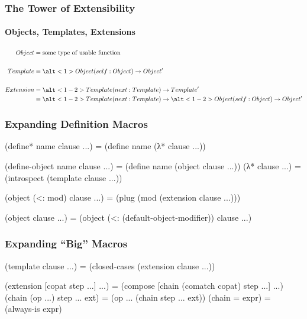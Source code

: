 \documentclass{beamer}
\begin{document}
\begin{frame}
\frametitle{The Tower of Extensibility}
\framesubtitle{Objects, Templates, Extensions}

\begin{align*}
  Object
  &=
  \text{some type of usable function}
  \\\\
  Template
  &=
  \alt<1>{Object}{(self : Object)} \to Object'
  \\\\
  Extension
  &=
  \alt<1-2>{Template}{(next : Template)} \to Template'
  \\
  &=
  \alt<1-2>{Template}{(next : Template)}
  \to \alt<1-2>{Object}{(self : Object)}
  \to Object'
\end{align*}

\pause\pause
\end{frame}

\let\mintscheme\scheme
\let\mintendscheme\endscheme
\let\scheme\relax
\let\endscheme\relax
{}

\begin{frame}[fragile]
\frametitle{Expanding Definition Macros}

\begin{scheme}
(define* name clause ...)
= (define name (λ* clause ...))

(define-object name clause ...)
= (define name (object clause ...))
\end{scheme}
\pause
\begin{scheme}
(λ* clause ...) = (introspect (template clause ...))

(object (<: mod) clause ...)
= (plug (mod (extension clause ...)))

(object clause ...)
= (object (<: (default-object-modifier)) clause ...)
\end{scheme}
\end{frame}

\begin{frame}[fragile]
\frametitle{Expanding ``Big'' Macros}

\begin{scheme}
(template clause ...)
= (closed-cases (extension clause ...))

(extension [copat step ...] ...)
= (compose [chain (comatch copat) step ...] ...)
\end{scheme}
\pause
\begin{scheme}
(chain (op ...) step ... ext)
= (op ... (chain step ... ext))
(chain = expr)
= (always-is expr)
\end{scheme}
\pause
\end{frame}
\end{document}
